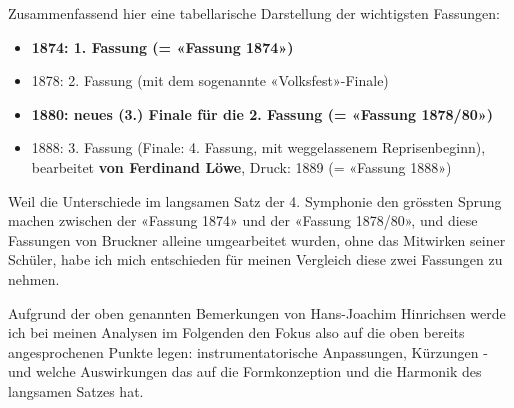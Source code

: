 Zusammenfassend hier eine tabellarische Darstellung der wichtigsten Fassungen\autocite{wiki:bruckner4}:

\begin{itemize}
	\item \textbf{1874: 1. Fassung (= «Fassung 1874»)}
	\item 1878: 2. Fassung (mit dem sogenannte «Volksfest»-Finale)
	\item \textbf{1880: neues (3.) Finale für die 2. Fassung (= «Fassung 1878/80»)}
	\item 1888: 3. Fassung (Finale: 4. Fassung, mit weggelassenem Reprisenbeginn), bearbeitet \textbf{von Ferdinand Löwe}, Druck: 1889 (= «Fassung 1888»)
\end{itemize}

Weil die Unterschiede im langsamen Satz der 4. Symphonie den grössten Sprung machen zwischen der «Fassung 1874» und der «Fassung 1878/80», und diese Fassungen von Bruckner alleine umgearbeitet wurden, ohne das Mitwirken seiner Schüler, habe ich mich entschieden für meinen Vergleich diese zwei Fassungen zu nehmen.

Aufgrund der oben genannten Bemerkungen von Hans-Joachim Hinrichsen werde ich bei meinen Analysen im Folgenden den Fokus also auf die oben bereits angesprochenen Punkte legen: instrumentatorische Anpassungen, Kürzungen - und welche Auswirkungen das auf die Formkonzeption und die Harmonik des langsamen Satzes hat. %
